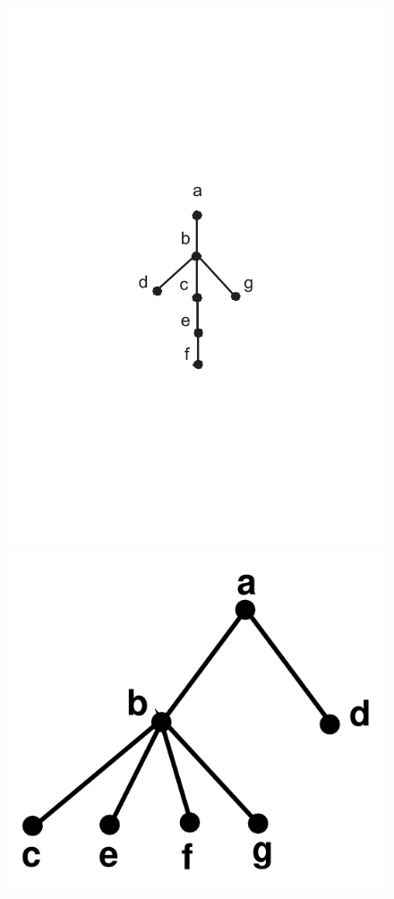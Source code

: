 \documentclass[ebook,oneside]{memoir}
\begin{document}
      \begin{center}
           \begin{figure}[h!]\centering
           \includegraphics[scale=0.22]{BEP2.pdf}
           \includegraphics[scale=0.22]{BEA2.pdf}
           \end{figure}
      \end{center}
\end{document}
